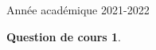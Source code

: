 \documentclass[a4paper, 11pt,openany]{book}%
\newtheorem[L]{thm}{Théorème}[section]
\newtheorem[M]{propo}[thm]{Proposition}
\newtheorem[M]{prop}[thm]{Propriété}
\newtheorem[M]{coro}[thm]{Corollaire}
\newtheorem[M]{lem}[thm]{Lemme}
\newtheorem[M,bodystyle=]{defi}[thm]{Définition}
\newtheorem[M,bodystyle=]{remark}[thm]{Remarque}
\newtheorem[M,bodystyle=]{met}[thm]{Méthode}
\newtheorem[M,bodystyle=]{ret}[thm]{A retenir}
\newtheorem[M,bodystyle=]{idee}[thm]{Idée}
\newtheorem[style=S,underline=false,bodystyle=]{exem}[thm]{Exemple}
\newtheorem[S,underline=false,bodystyle=]{exo}[thm]{Exercice}
\newtheorem[S,underline=false,bodystyle=]{appli}[thm]{Application}
\newtheorem[S,underline=false,bodystyle=]{sol}[thm]{Solution}
\newtheorem[S,underline=false,bodystyle=]{hypo}[thm]{Hypothesis}
\newtheorem[S,underline=false,bodystyle=]{nota}[thm]{Notation}
\newtheorem{cours}{Question de cours}
\begin{document}
\begin{titlepage}
\begin{sffamily}
\begin{center}

    \vfill

    {\large Année académique 2021-2022}

  \end{center}
  \end{sffamily}
\end{titlepage}
\begin{cours}
\end{cours}
\end{document}
